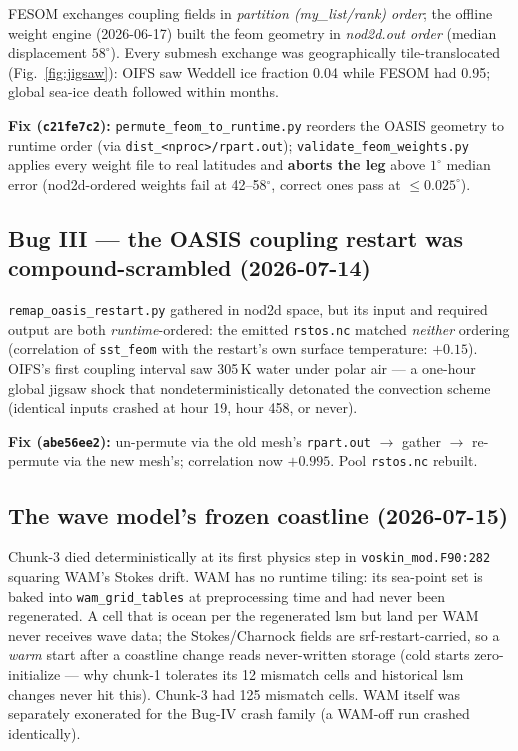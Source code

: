 \documentclass[11pt,a4paper]{article}
\newcommand{\code}[1]{\texttt{\small #1}}
\begin{document}
FESOM exchanges coupling fields in \emph{partition (my\_list/rank) order}; the offline weight engine
(2026-06-17) built the feom geometry in \emph{nod2d.out order} (median displacement $58^\circ$).
Every submesh exchange was geographically tile-translocated (Fig.~\ref{fig:jigsaw}): OIFS saw
Weddell ice fraction 0.04 while FESOM had 0.95; global sea-ice death followed within months.

\textbf{Fix (\code{c21fe7c2}):} \code{permute\_feom\_to\_runtime.py} reorders the OASIS geometry to
runtime order (via \code{dist\_<nproc>/rpart.out}); \code{validate\_feom\_weights.py} applies every
weight file to real latitudes and \textbf{aborts the leg} above $1^\circ$ median error (nod2d-ordered
weights fail at 42--58$^\circ$, correct ones pass at $\le0.025^\circ$).

\subsection{Bug III --- the OASIS coupling restart was compound-scrambled (2026-07-14)}\label{sec:bug3}

\code{remap\_oasis\_restart.py} gathered in nod2d space, but its input and required output are both
\emph{runtime}-ordered: the emitted \code{rstos.nc} matched \emph{neither} ordering (correlation of
\code{sst\_feom} with the restart's own surface temperature: $+0.15$). OIFS's first coupling interval
saw 305\,K water under polar air --- a one-hour global jigsaw shock that nondeterministically
detonated the convection scheme (identical inputs crashed at hour 19, hour 458, or never).

\textbf{Fix (\code{abe56ee2}):} un-permute via the old mesh's \code{rpart.out} $\to$ gather $\to$
re-permute via the new mesh's; correlation now $+0.995$. Pool \code{rstos.nc} rebuilt.

\subsection{The wave model's frozen coastline (2026-07-15)}\label{sec:wam}

Chunk-3 died deterministically at its first physics step in \code{voskin\_mod.F90:282} squaring
WAM's Stokes drift. WAM has no runtime tiling: its sea-point set is baked into
\code{wam\_grid\_tables} at preprocessing time and had never been regenerated. A cell that is ocean
per the regenerated lsm but land per WAM never receives wave data; the Stokes/Charnock fields are
srf-restart-carried, so a \emph{warm} start after a coastline change reads never-written storage
(cold starts zero-initialize --- why chunk-1 tolerates its 12 mismatch cells and historical lsm
changes never hit this). Chunk-3 had 125 mismatch cells. WAM itself was separately exonerated for
the Bug-IV crash family (a WAM-off run crashed identically).
\end{document}
